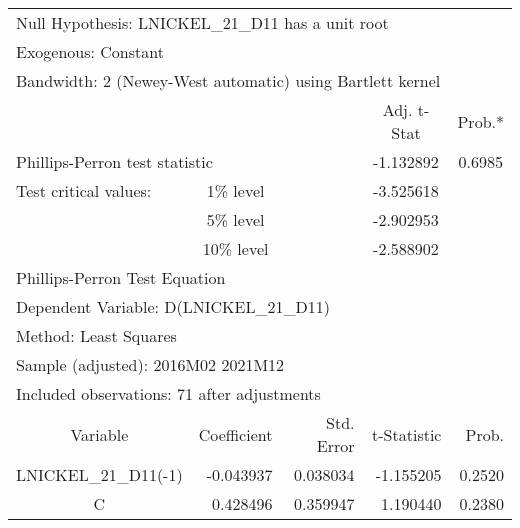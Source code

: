 \begin{tabular}{lrrrr}
\toprule
\multicolumn{4}{l}{Null Hypothesis: LNICKEL\_21\_D11 has a unit root}&\multicolumn{1}{c}{}\\
\multicolumn{2}{l}{Exogenous: Constant}&\multicolumn{1}{c}{}&\multicolumn{1}{c}{}&\multicolumn{1}{c}{}\\
\multicolumn{5}{l}{Bandwidth: 2 (Newey-West automatic) using Bartlett kernel}\\
\midrule
\multicolumn{1}{c}{}&\multicolumn{1}{c}{}&\multicolumn{1}{c}{}&\multicolumn{1}{c}{Adj. t-Stat}&\multicolumn{1}{c}{Prob.*}\\
\midrule
\multicolumn{2}{l}{Phillips-Perron test statistic}&\multicolumn{1}{l}{}&\multicolumn{1}{c}{-1.132892}&\multicolumn{1}{c}{0.6985}\\
\multicolumn{1}{l}{Test critical values:}&\multicolumn{1}{c}{1\% level}&\multicolumn{1}{c}{}&\multicolumn{1}{c}{-3.525618}&\multicolumn{1}{c}{}\\
\multicolumn{1}{c}{}&\multicolumn{1}{c}{5\% level}&\multicolumn{1}{c}{}&\multicolumn{1}{c}{-2.902953}&\multicolumn{1}{c}{}\\
\multicolumn{1}{c}{}&\multicolumn{1}{c}{10\% level}&\multicolumn{1}{c}{}&\multicolumn{1}{c}{-2.588902}&\multicolumn{1}{c}{}\\
\midrule
\multicolumn{2}{l}{Phillips-Perron Test Equation}&\multicolumn{1}{c}{}&\multicolumn{1}{c}{}&\multicolumn{1}{c}{}\\
\multicolumn{3}{l}{Dependent Variable: D(LNICKEL\_21\_D11)}&\multicolumn{1}{c}{}&\multicolumn{1}{c}{}\\
\multicolumn{2}{l}{Method: Least Squares}&\multicolumn{1}{c}{}&\multicolumn{1}{c}{}&\multicolumn{1}{c}{}\\
\multicolumn{3}{l}{Sample (adjusted): 2016M02 2021M12}&\multicolumn{1}{c}{}&\multicolumn{1}{c}{}\\
\multicolumn{4}{l}{Included observations: 71 after adjustments}&\multicolumn{1}{c}{}\\
\midrule
\multicolumn{1}{c}{Variable}&\multicolumn{1}{r}{Coefficient}&\multicolumn{1}{r}{Std. Error}&\multicolumn{1}{r}{t-Statistic}&\multicolumn{1}{r}{Prob.}\\
\midrule
\multicolumn{1}{c}{LNICKEL\_21\_D11(-1)}&\multicolumn{1}{r}{-0.043937}&\multicolumn{1}{r}{0.038034}&\multicolumn{1}{r}{-1.155205}&\multicolumn{1}{r}{0.2520}\\
\multicolumn{1}{c}{C}&\multicolumn{1}{r}{0.428496}&\multicolumn{1}{r}{0.359947}&\multicolumn{1}{r}{1.190440}&\multicolumn{1}{r}{0.2380}\\

\end{tabular}
